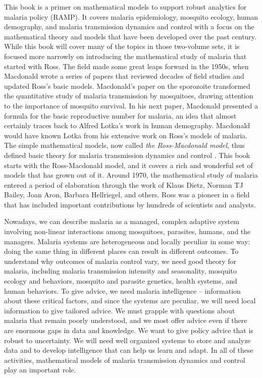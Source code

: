 \documentclass[
]{book}
\begin{document}
This book is a primer on mathematical models to support robust analytics for malaria policy (RAMP).
It covers malaria epidemiology, mosquito ecology, human demography, and malaria transmission dynamics and control with a focus on the mathematical theory and models that have been developed over the past century.
While this book will cover many of the topics in those two-volume sets, it is focused more narrowly on introducing the mathematical study of malaria that started with Ross.
The field made some great leaps forward in the 1950s, when Macdonald wrote a series of papers that reviewed decades of field studies and updated Ross's basic models.
Macdonald's paper on the sporozoite transformed the quantitative study of malaria transmission by mosquitoes, drawing attention to the importance of mosquito survival.
In his next paper, Macdonald presented a formula for the basic reproductive number for malaria, an idea that almost certainly traces back to Alfred Lotka's work in human demography.
Macdonald would have known Lotka from his extensive work on Ross's models of malaria.
The simple mathematical models, now called \emph{the Ross-Macdonald model}, thus defined basic theory for malaria transmission dynamics and control \autocite{SmithDL2012_RossMacdonald}.
This book starts with the Ross-Macdonald model, and it covers a rich and wonderful set of models that has grown out of it.
Around 1970, the mathematical study of malaria entered a period of elaboration through the work of Klaus Dietz, Norman TJ Bailey, Joan Aron, Barbara Hellriegel, and others.
Ross was a pioneer in a field that has included important contributions by hundreds of scientists and analysts.

Nowadays, we can describe malaria as a managed, complex adaptive system involving non-linear interactions among mosquitoes, parasites, humans, and the managers. Malaria systems are heterogeneous and locally peculiar in some way: doing the same thing in different places can result in different outcomes. To understand why outcomes of malaria control vary, we need good theory for malaria, including malaria transmission intensity and seasonality, mosquito ecology and behaviors, mosquito and parasite genetics, health systems, and human behaviors. To give advice, we need malaria intelligence -- information about these critical factors, and since the systems are peculiar, we will need local information to give tailored advice. We must grapple with questions about malaria that remain poorly understood, and we most offer advice even if there are enormous gaps in data and knowledge. We want to give policy advice that is robust to uncertainty. We will need well organized systems to store and analyze data and to develop intelligence that can help us learn and adapt. In all of these activities, mathematical models of malaria transmission dynamics and control play an important role.
\end{document}
